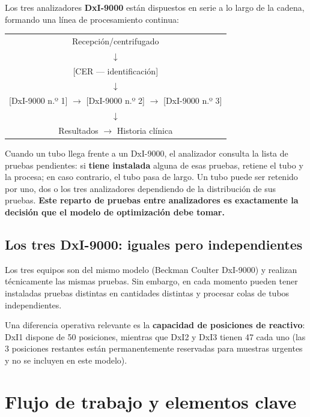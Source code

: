 \documentclass[12pt, a4paper]{article}
\begin{document}
Los tres analizadores \textbf{DxI-9000} están dispuestos en serie a lo largo de la cadena,
formando una línea de procesamiento continua:

\begin{center}
\ttfamily\small
\begin{tabular}{c}
Recepción/centrifugado \\
$\downarrow$ \\
{[CER --- identificación]} \\
$\downarrow$ \\
{[DxI-9000 n.º 1] $\longrightarrow$ [DxI-9000 n.º 2] $\longrightarrow$ [DxI-9000 n.º 3]} \\
$\downarrow$ \\
Resultados $\rightarrow$ Historia clínica
\end{tabular}
\end{center}

Cuando un tubo llega frente a un DxI-9000, el analizador consulta la lista de pruebas
pendientes: si \textbf{tiene instalada} alguna de esas pruebas, retiene el tubo y la
procesa; en caso contrario, el tubo pasa de largo. Un tubo puede ser retenido por uno,
dos o los tres analizadores dependiendo de la distribución de sus pruebas.
\textbf{Este reparto de pruebas entre analizadores es exactamente la decisión que el modelo
de optimización debe tomar.}

\subsection{Los tres DxI-9000: iguales pero independientes}

Los tres equipos son del mismo modelo (Beckman Coulter DxI-9000) y realizan técnicamente
las mismas pruebas. Sin embargo, en cada momento pueden tener instaladas pruebas distintas
en cantidades distintas y procesar colas de tubos independientes.

Una diferencia operativa relevante es la \textbf{capacidad de posiciones de reactivo}:
DxI1 dispone de 50 posiciones, mientras que DxI2 y DxI3 tienen 47 cada uno (las 3
posiciones restantes están permanentemente reservadas para muestras urgentes y no se
incluyen en este modelo).

\clearpage
\section{Flujo de trabajo y elementos clave}
\end{document}
